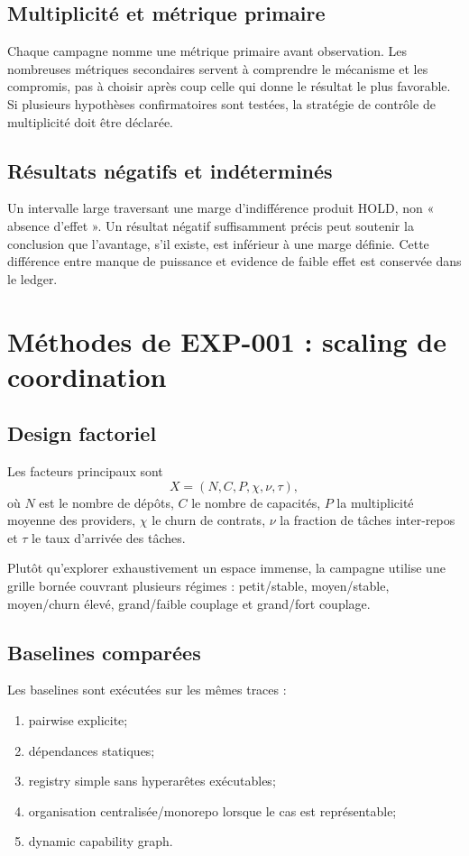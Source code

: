 \section{Multiplicité et métrique primaire}

Chaque campagne nomme une métrique primaire avant observation. Les nombreuses métriques secondaires servent à comprendre le mécanisme et les compromis, pas à choisir après coup celle qui donne le résultat le plus favorable. Si plusieurs hypothèses confirmatoires sont testées, la stratégie de contrôle de multiplicité doit être déclarée.

\section{Résultats négatifs et indéterminés}

Un intervalle large traversant une marge d'indifférence produit HOLD, non « absence d'effet ». Un résultat négatif suffisamment précis peut soutenir la conclusion que l'avantage, s'il existe, est inférieur à une marge définie. Cette différence entre manque de puissance et evidence de faible effet est conservée dans le ledger.

\chapter{Méthodes de EXP-001 : scaling de coordination}

\section{Design factoriel}

Les facteurs principaux sont
\[
X=(N,C,P,\chi,\nu,\tau),
\]
où $N$ est le nombre de dépôts, $C$ le nombre de capacités, $P$ la multiplicité moyenne des providers, $\chi$ le churn de contrats, $\nu$ la fraction de tâches inter-repos et $\tau$ le taux d'arrivée des tâches.

Plutôt qu'explorer exhaustivement un espace immense, la campagne utilise une grille bornée couvrant plusieurs régimes : petit/stable, moyen/stable, moyen/churn élevé, grand/faible couplage et grand/fort couplage.

\section{Baselines comparées}

Les baselines sont exécutées sur les mêmes traces :
\begin{enumerate}
  \item pairwise explicite;
  \item dépendances statiques;
  \item registry simple sans hyperarêtes exécutables;
  \item organisation centralisée/monorepo lorsque le cas est représentable;
  \item dynamic capability graph.
\end{enumerate}

